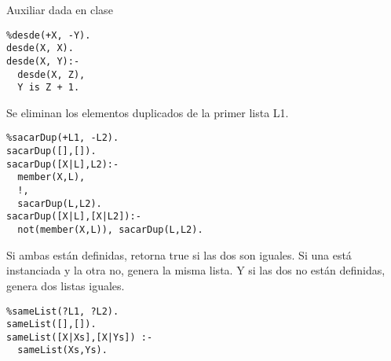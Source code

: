 \documentclass[10pt, a4paper,english,spanish,hidelinks]{article}
\begin{document}
Auxiliar dada en clase
\begin{verbatim}
%desde(+X, -Y).
desde(X, X).
desde(X, Y):-
  desde(X, Z),
  Y is Z + 1.
\end{verbatim}


Se eliminan los elementos duplicados de la primer lista L1.
\begin{verbatim}
%sacarDup(+L1, -L2).
sacarDup([],[]).
sacarDup([X|L],L2):-
  member(X,L),
  !,
  sacarDup(L,L2).
sacarDup([X|L],[X|L2]):-
  not(member(X,L)), sacarDup(L,L2).
\end{verbatim}

Si ambas están definidas, retorna true si las dos son iguales.
Si una está instanciada y la otra no, genera la misma lista.
Y si las dos no están definidas, genera dos listas iguales.

\begin{verbatim}
%sameList(?L1, ?L2).
sameList([],[]).
sameList([X|Xs],[X|Ys]) :- 
  sameList(Xs,Ys).
\end{verbatim}
\end{document}
